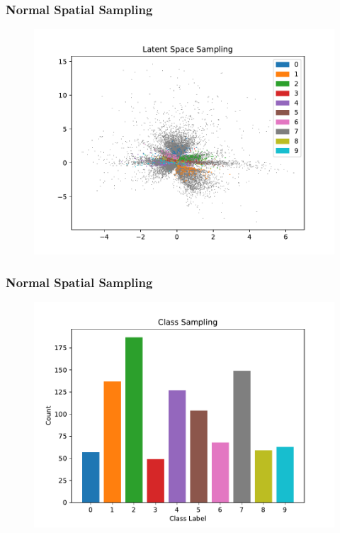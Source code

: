 \documentclass[10pt, usenames, dvipsnames, table]{beamer}
\begin{document}
\begin{frame}
  \frametitle{Normal Spatial Sampling}
  \begin{figure}
    \centering
    \includegraphics[width=\linewidth]
    {models/mnist_conv_e300_L2_b64/normal_sampling_1000}
    \caption{}
    \label{}
  \end{figure}
\end{frame}

\begin{frame}
  \frametitle{Normal Spatial Sampling}
  \begin{figure}
    \centering
    \includegraphics[width=\linewidth]
    {models/mnist_conv_e300_L2_b64/normal_sampling_distribution_1000}
    \caption{}
    \label{}
  \end{figure}
\end{frame}
\end{document}
